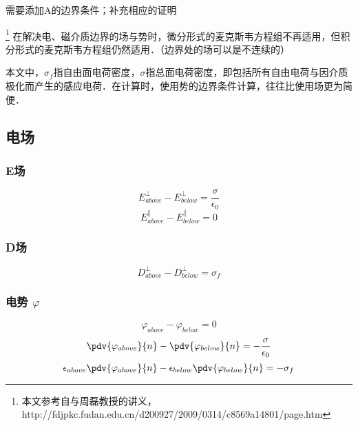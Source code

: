 
\begin{issues}
\issueTODO 需要添加A的边界条件；补充相应的证明
\end{issues}

\footnote{本文参考自\cite{GriffE}与周磊教授的讲义，http://fdjpkc.fudan.edu.cn/d200927/2009/0314/c8569a14801/page.htm}
在解决电、磁介质边界的场与势时，微分形式的麦克斯韦方程组不再适用，但积分形式的麦克斯韦方程组仍然适用．（边界处的场可以是不连续的）

本文中，$\sigma_f$指自由面电荷密度，$\sigma$指总面电荷密度，即包括所有自由电荷与因介质极化而产生的感应电荷．在计算时，使用势的边界条件计算，往往比使用场更为简便．

\subsection{电场}

\subsubsection{E场}
\begin{equation}
E^\perp_{above} - E^\perp_{below} = \frac{\sigma}{\epsilon_0}
\end{equation}
\begin{equation}
E^\parallel_{above} - E^\parallel_{below} = 0
\end{equation}

\subsubsection{D场}
\begin{equation}
D^\perp_{above} - D^\perp_{below} = \sigma_f
\end{equation}

\subsubsection{电势 $\varphi$}
\begin{equation}
\varphi_{above}-\varphi_{below}=0
\end{equation}
\begin{equation}
\pdv{\varphi_{above}}{n} - \pdv{\varphi_{below}}{n}  = -\frac{\sigma}{\epsilon_0}
\end{equation}
\begin{equation}
\epsilon_{above}\pdv{\varphi_{above}}{n} - \epsilon_{below}\pdv{\varphi_{below}}{n}  = -\sigma_f
\end{equation}

